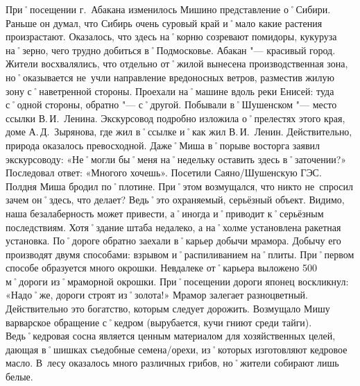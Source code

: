 При˚посещении г.~Абакана изменилось Мишино представление о˚Сибири. Раньше он думал, что Сибирь очень суровый край и˚мало какие растения произрастают. Оказалось, что здесь на˚корню созревают помидоры, кукуруза на˚зерно, чего трудно добиться в˚Подмосковье. Абакан "--- красивый город. Жители восхвалялись, что отдельно от˚жилой вынесена производственная зона, но˚оказывается не~учли направление вредоносных ветров, разместив жилую зону с˚наветренной стороны. Проехали на˚машине вдоль реки Енисей: туда с˚одной стороны, обратно "--- с˚другой. Побывали в˚Шушенском "--- место ссылки В.\,И.~Ленина. Экскурсовод подробно изложила о˚прелестях этого края, доме А.\,Д.~Зырянова, где жил в˚ссылке и˚как жил В.\,И.~Ленин. Действительно, природа оказалось превосходной. Даже˚Миша в˚порыве восторга заявил экскурсоводу: «Не˚могли бы˚меня на˚недельку оставить здесь в˚заточении?» Последовал ответ: «Многого хочешь». Посетили Саяно\-/Шушенскую ГЭС. Полдня Миша бродил по˚плотине. При˚этом возмущался, что никто не~спросил зачем он˚здесь, что делает? Ведь˚это охраняемый, серьёзный объект. Видимо, наша безалаберность может привести, а˚иногда и˚приводит к˚серьёзным последствиям. Хотя˚здание штаба недалеко, а на˚холме установлена ракетная установка. По˚дороге обратно заехали в˚карьер добычи мрамора. Добычу его производят двумя способами: взрывом и˚распиливанием на˚плиты. При˚первом способе образуется много окрошки. Невдалеке от˚карьера выложено 500\,м˚дороги из˚мраморной окрошки. При˚посещении дороги японец воскликнул: «Надо˚же, дороги строят из˚золота!» Мрамор залегает разноцветный. Действительно это богатство, которым следует дорожить. Возмущало Мишу варварское обращение с˚кедром (вырубается, кучи гниют среди тайги). Ведь˚кедровая сосна является ценным материалом для хозяйственных целей, дающая в˚шишках съедобные семена\-/орехи, из˚которых изготовляют кедровое масло. В~лесу оказалось много различных грибов, но˚жители собирают лишь белые.

